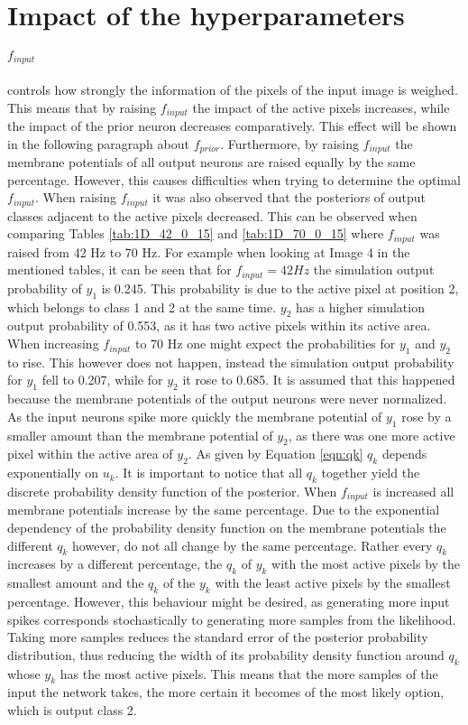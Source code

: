 \section{Impact of the hyperparameters}
\label{section:impactHyper}
\paragraph{$f_{input}$} controls how strongly the information of the pixels of the input image is weighed. This means that by raising $f_{input}$ the impact of the active pixels increases, while the impact of the prior neuron decreases comparatively. This effect will be shown in the following paragraph about $f_{prior}$. Furthermore, by raising $f_{input}$ the membrane potentials of all output neurons are raised equally by the same percentage. However, this causes difficulties when trying to determine the optimal $f_{input}$. When raising $f_{input}$ it was also observed that the posteriors of output classes adjacent to the active pixels decreased. This can be observed when comparing Tables \ref{tab:1D_42_0_15} and \ref{tab:1D_70_0_15} where $f_{input}$ was raised from 42 Hz to 70 Hz. For example when looking at Image 4 in the mentioned tables, it can be seen that for $f_{input} = 42 Hz$ the simulation output probability of $y_1$ is 0.245. This probability is due to the active pixel at position 2, which belongs to class 1 and 2 at the same time. $y_2$ has a higher simulation output probability of 0.553, as it has two active pixels within its active area. When increasing $f_{input}$ to 70 Hz one might expect the probabilities for $y_1$ and $y_2$ to rise. This however does not happen, instead the simulation output probability for $y_1$ fell to 0.207, while for $y_2$ it rose to 0.685. It is assumed that this happened because the membrane potentials of the output neurons were never normalized. As the input neurons spike more quickly the membrane potential of $y_1$ rose by a smaller amount than the membrane potential of $y_2$, as there was one more active pixel within the active area of $y_2$. As given by Equation \ref{eqn:qk} $q_k$ depends exponentially on $u_k$. It is important to notice that all $q_k$ together yield the discrete probability density function of the posterior. When $f_{input}$ is increased all membrane potentials increase by the same percentage. Due to the exponential dependency of the probability density function on the membrane potentials the different $q_k$ however, do not all change by the same percentage. Rather every $q_k$ increases by a different percentage, the $q_k$ of $y_k$ with the most active pixels by the smallest amount and the $q_k$ of the $y_k$ with the least active pixels by the smallest percentage. However, this behaviour might be desired, as generating more input spikes corresponds stochastically to generating more samples from the likelihood. Taking more samples reduces the standard error of the posterior probability distribution, thus reducing the width of its probability density function around $q_k$ whose $y_k$ has the most active pixels. This means that the more samples of the input the network takes, the more certain it becomes of the most likely option, which is output class 2.

